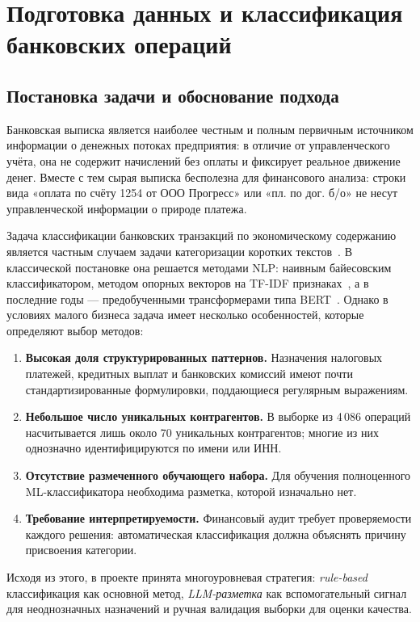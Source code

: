 \chapter{Подготовка данных и классификация банковских операций}

\section{Постановка задачи и обоснование подхода}

Банковская выписка является наиболее честным и полным первичным источником информации о денежных потоках предприятия: в отличие от управленческого учёта, она не содержит начислений без оплаты и фиксирует реальное движение денег. Вместе с тем сырая выписка бесполезна для финансового анализа: строки вида «оплата по счёту 1254 от ООО Прогресс» или «пл. по дог. б/о» не несут управленческой информации о природе платежа.

Задача классификации банковских транзакций по экономическому содержанию является частным случаем задачи категоризации коротких текстов~\cite{aggarwal2012survey}. В классической постановке она решается методами NLP: наивным байесовским классификатором, методом опорных векторов на TF-IDF признаках~\cite{sebastiani2002machine}, а в последние годы --- предобученными трансформерами типа BERT~\cite{devlin2018bert}. Однако в условиях малого бизнеса задача имеет несколько особенностей, которые определяют выбор методов:
\begin{enumerate}
  \item \textbf{Высокая доля структурированных паттернов.} Назначения налоговых платежей, кредитных выплат и банковских комиссий имеют почти стандартизированные формулировки, поддающиеся регулярным выражениям.
  \item \textbf{Небольшое число уникальных контрагентов.} В выборке из 4\,086 операций насчитывается лишь около 70 уникальных контрагентов; многие из них однозначно идентифицируются по имени или ИНН.
  \item \textbf{Отсутствие размеченного обучающего набора.} Для обучения полноценного ML-классификатора необходима разметка, которой изначально нет.
  \item \textbf{Требование интерпретируемости.} Финансовый аудит требует проверяемости каждого решения: автоматическая классификация должна объяснять причину присвоения категории.
\end{enumerate}

Исходя из этого, в проекте принята многоуровневая стратегия: \textit{rule-based} классификация как основной метод, \textit{LLM-разметка} как вспомогательный сигнал для неоднозначных назначений и ручная валидация выборки для оценки качества.

